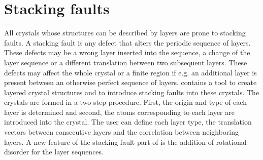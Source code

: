
\section{Stacking faults \label{mod-stack}}

All crystals whose structures can be described by layers are prone
to stacking faults.  A stacking fault is any defect that alters the
periodic sequence of layers.  These defects may be a wrong layer
inserted into the sequence, a change of the layer sequence or a
different translation between two subsequent layers.  These defects
may affect the whole crystal or a finite region if e.g. an
additional layer is present between an otherwise perfect sequence of
layers.  \Discus contains a tool to create layered crystal
structures and to introduce stacking faults into these crystals. The
crystals are formed in a two step procedure. First, the origin and
type of each layer is determined and second, the atoms corresponding
to each layer are introduced into the crystal.  The user can define
each layer type, the translation vectors between consecutive layers
and the correlation between neighboring layers. A new feature of the
stacking fault part of \Discus is the addition of rotational
disorder for the layer sequences. \par

